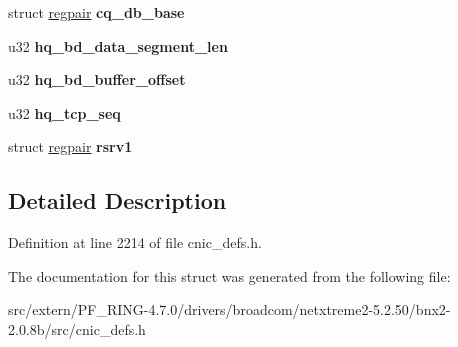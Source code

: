 \begin{DoxyCompactItemize}
\item 
\hypertarget{structcstorm__iscsi__st__context_a73b73411ffe3d220919a7b21b8373a2c}{
struct \hyperlink{structregpair}{regpair} {\bfseries cq\_\-db\_\-base}}
\label{structcstorm__iscsi__st__context_a73b73411ffe3d220919a7b21b8373a2c}

\item 
\hypertarget{structcstorm__iscsi__st__context_a18884d359c8ccacfbe864fd45d522207}{
u32 {\bfseries hq\_\-bd\_\-data\_\-segment\_\-len}}
\label{structcstorm__iscsi__st__context_a18884d359c8ccacfbe864fd45d522207}

\item 
\hypertarget{structcstorm__iscsi__st__context_a505c5c6275a20e0b8ea51545b6ffa871}{
u32 {\bfseries hq\_\-bd\_\-buffer\_\-offset}}
\label{structcstorm__iscsi__st__context_a505c5c6275a20e0b8ea51545b6ffa871}

\item 
\hypertarget{structcstorm__iscsi__st__context_acd4e54f84bcae0f1d892c3cc589805db}{
u32 {\bfseries hq\_\-tcp\_\-seq}}
\label{structcstorm__iscsi__st__context_acd4e54f84bcae0f1d892c3cc589805db}

\item 
\hypertarget{structcstorm__iscsi__st__context_a9dd5693ed6cb012607ed8d23020a8a6e}{
struct \hyperlink{structregpair}{regpair} {\bfseries rsrv1}}
\label{structcstorm__iscsi__st__context_a9dd5693ed6cb012607ed8d23020a8a6e}

\end{DoxyCompactItemize}


\subsection{Detailed Description}


Definition at line 2214 of file cnic\_\-defs.h.



The documentation for this struct was generated from the following file:\begin{DoxyCompactItemize}
\item 
src/extern/PF\_\-RING-\/4.7.0/drivers/broadcom/netxtreme2-\/5.2.50/bnx2-\/2.0.8b/src/cnic\_\-defs.h\end{DoxyCompactItemize}
